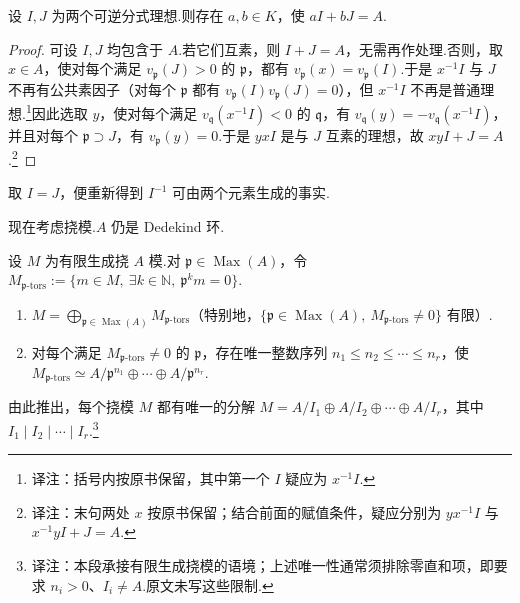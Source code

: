 \begin{lemma*}
设 $I,J$ 为两个可逆分式理想.则存在 $a,b\in K$，使 $aI+bJ=A$.
\end{lemma*}
\begin{proof}
可设 $I,J$ 均包含于 $A$.若它们互素，则 $I+J=A$，无需再作处理.否则，取 $x\in A$，使对每个满足 $v_{\mathfrak p}(J)>0$ 的 $\mathfrak p$，都有 $v_{\mathfrak p}(x)=v_{\mathfrak p}(I)$.于是 $x^{-1}I$ 与 $J$ 不再有公共素因子（对每个 $\mathfrak p$ 都有 $v_{\mathfrak p}(I)v_{\mathfrak p}(J)=0$），但 $x^{-1}I$ 不再是普通理想.\footnote{译注：括号内按原书保留，其中第一个 $I$ 疑应为 $x^{-1}I$.}因此选取 $y$，使对每个满足 $v_{\mathfrak q}(x^{-1}I)<0$ 的 $\mathfrak q$，有 $v_{\mathfrak q}(y)=-v_{\mathfrak q}(x^{-1}I)$，并且对每个 $\mathfrak p\supset J$，有 $v_{\mathfrak p}(y)=0$.于是 $yxI$ 是与 $J$ 互素的理想，故 $xyI+J=A$.\footnote{译注：末句两处 $x$ 按原书保留；结合前面的赋值条件，疑应分别为 $yx^{-1}I$ 与 $x^{-1}yI+J=A$.}
\end{proof}
\begin{remark*}
取 $I=J$，便重新得到 $I^{-1}$ 可由两个元素生成的事实.
\end{remark*}
现在考虑挠模.$A$ 仍是 Dedekind 环.
\begin{proposition*}
设 $M$ 为有限生成挠 $A$ 模.对 $\mathfrak p\in\operatorname{Max}(A)$，令 $M_{\mathfrak p\text{-}\mathrm{tors}}:=\{m\in M,\ \exists k\in\mathbb N,\ \mathfrak p^km=0\}$.
\begin{enumerate}[label=\roman*)]
\item $M=\bigoplus_{\mathfrak p\in\operatorname{Max}(A)}M_{\mathfrak p\text{-}\mathrm{tors}}$（特别地，$\{\mathfrak p\in\operatorname{Max}(A),\ M_{\mathfrak p\text{-}\mathrm{tors}}\ne0\}$ 有限）.
\item 对每个满足 $M_{\mathfrak p\text{-}\mathrm{tors}}\ne0$ 的 $\mathfrak p$，存在唯一整数序列 $n_1\le n_2\le\cdots\le n_r$，使 $M_{\mathfrak p\text{-}\mathrm{tors}}\simeq A/\mathfrak p^{n_1}\oplus\cdots\oplus A/\mathfrak p^{n_r}$.
\end{enumerate}
\end{proposition*}
\begin{exercise*}
由此推出，每个挠模 $M$ 都有唯一的分解 $M=A/I_1\oplus A/I_2\oplus\cdots\oplus A/I_r$，其中 $I_1\mid I_2\mid\cdots\mid I_r$.\footnote{译注：本段承接有限生成挠模的语境；上述唯一性通常须排除零直和项，即要求 $n_i>0$、$I_i\ne A$.原文未写这些限制.}
\end{exercise*}
